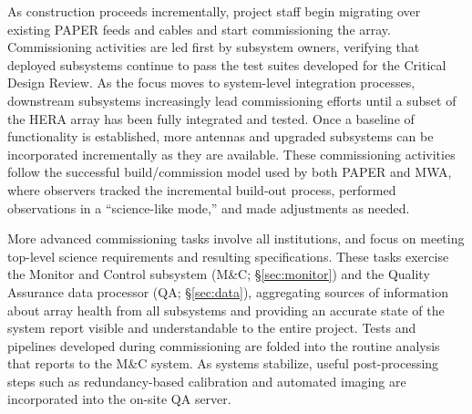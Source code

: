 \documentclass[preprint]{aastex}
\begin{document}


As construction proceeds incrementally, project staff begin migrating over existing PAPER feeds and cables 
and start commissioning the array.  
Commissioning activities are led first by subsystem owners, verifying that deployed subsystems 
continue to pass the test suites developed for the Critical Design Review.
As the focus moves to system-level integration processes, downstream subsystems increasingly
lead commissioning efforts until a subset of the HERA
array has been fully integrated and tested.  Once a baseline of functionality is established,
more antennas and upgraded subsystems can be incorporated incrementally as they are available.
These commissioning activities follow the successful
build/commission model used by both PAPER and MWA, %
where observers tracked the incremental build-out
process, performed observations in a ``science-like mode,'' and made
adjustments as needed. 

More advanced commissioning tasks involve all institutions, and
focus on meeting top-level science requirements
and resulting specifications.  %
These tasks exercise the Monitor and Control subsystem (M\&C; \S\ref{sec:monitor})
and the Quality Assurance data processor (QA; \S\ref{sec:data}), 
aggregating sources of
information about array health from all subsystems and providing an accurate
state of the system report visible and understandable to the entire project.
Tests and pipelines developed during commissioning are folded into
the routine analysis that reports to the M\&C system.  As systems stabilize,
useful post-processing steps such as redundancy-based calibration and automated
imaging are incorporated into the on-site QA server.
\end{document}
